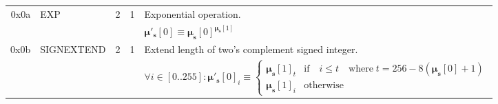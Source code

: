 \documentclass[9pt,oneside]{amsart}
\begin{document}
\begin{tabular*}{\columnwidth}[h]{rlrrl}
\midrule
0x0a & {\small EXP} & 2 & 1 & Exponential operation. \\
&&&& $\boldsymbol{\mu}'_\mathbf{s}[0] \equiv \boldsymbol{\mu}_\mathbf{s}[0] ^ {\boldsymbol{\mu}_\mathbf{s}[1] }$ \\
\midrule
0x0b & {\small SIGNEXTEND} & 2 & 1 & Extend length of two's complement signed integer. \\
&&&& $ \forall i \in [0..255]: \boldsymbol{\mu}'_\mathbf{s}[0]_i \equiv \begin{cases} \boldsymbol{\mu}_\mathbf{s}[1]_t &\text{if} \quad i \leqslant t \quad \text{where} \; t = 256 - 8(\boldsymbol{\mu}_\mathbf{s}[0] + 1) \\ \boldsymbol{\mu}_\mathbf{s}[1]_i &\text{otherwise} \end{cases}$
\end{tabular*}
\end{document}
